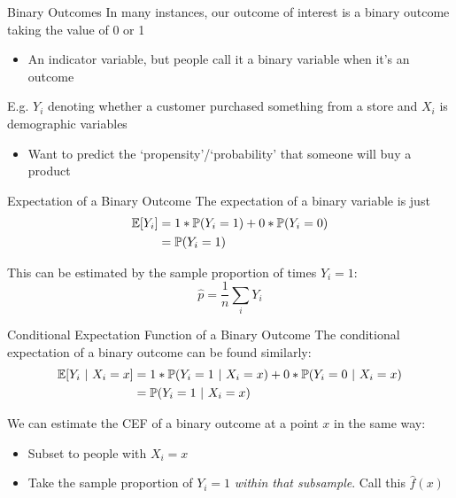 \documentclass[aspectratio=169,t,11pt,table]{beamer}
\begin{document}
\begin{frame}{Binary Outcomes}
  In many instances, our outcome of interest is a \alert{binary outcome} taking the value of 0 or 1
  \begin{itemize}
    \item An indicator variable, but people call it a binary variable when it's an outcome
  \end{itemize}
  
  \bigskip
  E.g. $Y_i$ denoting whether a customer purchased something from a store and $X_i$ is demographic variables
  \begin{itemize}
    \item Want to predict the `propensity'/`probability' that someone will buy a product 
  \end{itemize}
\end{frame}

\begin{frame}{Expectation of a Binary Outcome}
  The expectation of a binary variable is just 
  \begin{align*}
    \expec{Y_i} &= 
    1 * \prob{Y_i = 1} + 0 * \prob{Y_i = 0} \\
    &= \prob{Y_i = 1}
  \end{align*}
  
  \bigskip
  This can be estimated by the sample proportion of times $Y_i = 1$:
  $$
    \hat{p} = \frac{1}{n} \sum_i Y_i
  $$
\end{frame}

\begin{frame}{Conditional Expectation Function of a Binary Outcome}
  The conditional expectation of a binary outcome can be found similarly:
  \begin{align*}
    \expec{Y_i}{X_i = x} &= 
    1 * \prob{Y_i = 1}{X_i = x} + 0 * \prob{Y_i = 0}{X_i = x} \\
    &= \prob{Y_i = 1}{X_i = x}
  \end{align*}
  
  \bigskip
  We can estimate the CEF of a binary outcome at a point $x$ in the same way:
  \begin{itemize}
    \item Subset to people with $X_i = x$
    \item Take the sample proportion of $Y_i = 1$ \emph{within that subsample}. Call this $\hat{f}(x)$
  \end{itemize}
\end{frame}
\end{document}
